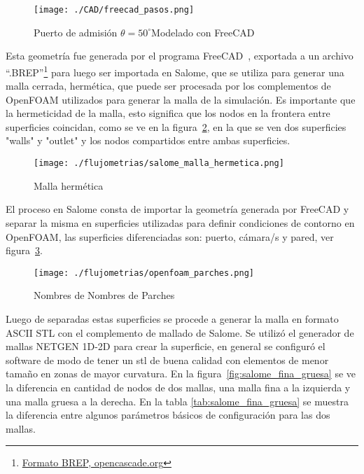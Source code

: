\begin{figure}
    \centering
    \texttt{[image: ./CAD/freecad\_pasos.png]}
    \caption{Puerto de admisión $\theta=50^{\circ}$Modelado con
FreeCAD}\label{fig:admision_50}
\end{figure}

Esta geometría fue generada por el programa FreeCAD~\parencite{freecad},
exportada a un archivo
``.BREP''\footnote{\href{https://dev.opencascade.org/doc/overview/html/specification\_\_brep\_format.html}{Formato
BREP, opencascade.org}} para luego ser importada en Salome\parencite{salome},
que se utiliza para generar una malla cerrada, hermética, que puede ser
procesada por los complementos de OpenFOAM utilizados para generar la malla de
la simulación.
%
Es importante que la hermeticidad de la malla, esto significa que los nodos en
la frontera entre superficies coincidan, como se ve en la
figura~\ref{fig:salome_malla_hermetica}, en la que se ven dos superficies
"walls" y "outlet" y los nodos compartidos entre ambas superficies.
%

\begin{figure}[ht]
    \centering
    \texttt{[image: ./flujometrias/salome\_malla\_hermetica.png]}
    \caption{Malla hermética}\label{fig:salome_malla_hermetica}
\end{figure}

El proceso en Salome consta de importar la geometría generada por FreeCAD y
separar la misma en superficies utilizadas para definir condiciones de contorno
en OpenFOAM, las superficies diferenciadas son: puerto, cámara/s y pared, ver
figura~\ref{fig:openfoam_parches}.

\begin{figure}[ht]
    \centering
    \texttt{[image: ./flujometrias/openfoam\_parches.png]}
    \caption{Nombres de Nombres de Parches}\label{fig:openfoam_parches}
\end{figure}

Luego de separadas estas superficies se procede a generar la malla en formato
ASCII STL con el complemento de mallado de Salome.
%
Se utilizó el generador de mallas NETGEN 1D-2D para crear la superficie, en
general se configuró el software de modo de tener un stl de buena calidad con
elementos de menor tamaño en zonas de mayor curvatura.
%
En la figura~\ref{fig:salome_fina_gruesa} se ve la diferencia en cantidad de
nodos de dos mallas, una malla fina a la izquierda y una malla gruesa a la
derecha.
%
En la tabla \ref{tab:salome_fina_gruesa} se muestra la diferencia entre algunos
parámetros básicos de configuración para las dos mallas.
%

